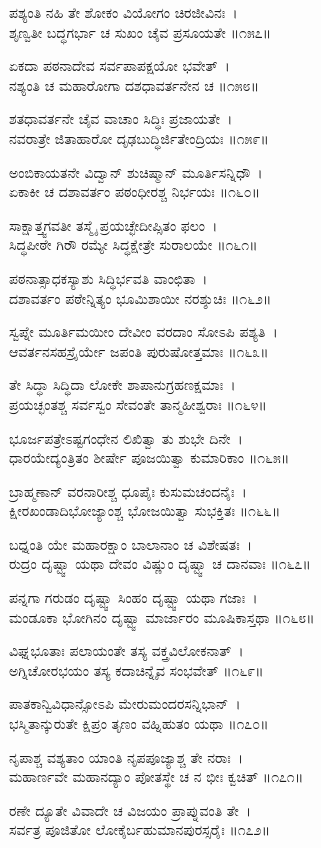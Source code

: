 ಪಶ್ಯಂತಿ ನಹಿ ತೇ ಶೋಕಂ ವಿಯೋಗಂ ಚಿರಜೀವಿನಃ~।\\
ಶೃಣ್ವತೀ ಬದ್ಧಗರ್ಭಾ ಚ ಸುಖಂ ಚೈವ ಪ್ರಸೂಯತೇ ॥೧೫೭॥

ಏಕದಾ ಪಠನಾದೇವ ಸರ್ವಪಾಪಕ್ಷಯೋ ಭವೇತ್~।\\
ನಶ್ಯಂತಿ ಚ ಮಹಾರೋಗಾ ದಶಧಾವರ್ತನೇನ ಚ ॥೧೫೮॥

ಶತಧಾವರ್ತನೇ ಚೈವ ವಾಚಾಂ ಸಿದ್ಧಿಃ ಪ್ರಜಾಯತೇ~।\\
ನವರಾತ್ರೇ ಜಿತಾಹಾರೋ ದೃಢಬುದ್ಧಿರ್ಜಿತೇಂದ್ರಿಯಃ ॥೧೫೯॥

ಅಂಬಿಕಾಯತನೇ ವಿದ್ವಾನ್ ಶುಚಿಷ್ಮಾನ್ ಮೂರ್ತಿಸನ್ನಿಧೌ~।\\
ಏಕಾಕೀ ಚ ದಶಾವರ್ತಂ ಪಠಂಧೀರಶ್ಚ ನಿರ್ಭಯಃ ॥೧೬೦॥

ಸಾಕ್ಷಾತ್ತ್ವಗವತೀ ತಸ್ಮೈ ಪ್ರಯಚ್ಛೇದೀಪ್ಸಿತಂ ಫಲಂ~।\\
ಸಿದ್ಧಪೀಠೇ ಗಿರೌ ರಮ್ಯೇ ಸಿದ್ಧಕ್ಷೇತ್ರೇ ಸುರಾಲಯೇ ॥೧೬೧॥

ಪಠನಾತ್ಸಾಧಕಸ್ಯಾಶು ಸಿದ್ಧಿರ್ಭವತಿ ವಾಂಛಿತಾ~।\\
ದಶಾವರ್ತಂ ಪಠೇನ್ನಿತ್ಯಂ ಭೂಮಿಶಾಯೀ ನರಶ್ಶುಚಿಃ ॥೧೬೨॥

ಸ್ವಪ್ನೇ ಮೂರ್ತಿಮಯೀಂ ದೇವೀಂ ವರದಾಂ ಸೋಽಪಿ ಪಶ್ಯತಿ~।\\
ಆವರ್ತನಸಹಸ್ರೈರ್ಯೇ ಜಪಂತಿ ಪುರುಷೋತ್ತಮಾಃ ॥೧೬೩॥

ತೇ ಸಿದ್ಧಾ ಸಿದ್ಧಿದಾ ಲೋಕೇ ಶಾಪಾನುಗ್ರಹಣಕ್ಷಮಾಃ~।\\
ಪ್ರಯಚ್ಛಂತಶ್ಚ ಸರ್ವಸ್ವಂ ಸೇವಂತೇ ತಾನ್ಮಹೀಶ್ವರಾಃ ॥೧೬೪॥

ಭೂರ್ಜಪತ್ರೇಽಷ್ಟಗಂಧೇನ ಲಿಖಿತ್ವಾ ತು ಶುಭೇ ದಿನೇ~।\\
ಧಾರಯೇದ್ಯಂತ್ರಿತಂ ಶೀರ್ಷೇ ಪೂಜಯಿತ್ವಾ ಕುಮಾರಿಕಾಂ ॥೧೬೫॥

ಬ್ರಾಹ್ಮಣಾನ್ ವರನಾರೀಶ್ಚ ಧೂಪೈಃ ಕುಸುಮಚಂದನೈಃ~।\\
ಕ್ಷೀರಖಂಡಾದಿಭೋಜ್ಯಾಂಶ್ಚ ಭೋಜಯಿತ್ವಾ ಸುಭಕ್ತಿತಃ ॥೧೬೬॥

ಬಧ್ನಂತಿ ಯೇ ಮಹಾರಕ್ಷಾಂ ಬಾಲಾನಾಂ ಚ ವಿಶೇಷತಃ~।\\
ರುದ್ರಂ ದೃಷ್ಟ್ವಾ ಯಥಾ ದೇವಂ ವಿಷ್ಣುಂ ದೃಷ್ಟ್ವಾ ಚ ದಾನವಾಃ ॥೧೬೭॥

ಪನ್ನಗಾ ಗರುಡಂ ದೃಷ್ಟ್ವಾ ಸಿಂಹಂ ದೃಷ್ಟ್ವಾ ಯಥಾ ಗಜಾಃ~।\\
ಮಂಡೂಕಾ ಭೋಗಿನಂ ದೃಷ್ಟ್ವಾ ಮಾರ್ಜಾರಂ ಮೂಷಿಕಾಸ್ತಥಾ ॥೧೬೮॥

ವಿಘ್ನಭೂತಾಃ ಪಲಾಯಂತೇ ತಸ್ಯ ವಕ್ತ್ರವಿಲೋಕನಾತ್~।\\
ಅಗ್ನಿಚೋರಭಯಂ ತಸ್ಯ ಕದಾಚಿನ್ನೈವ ಸಂಭವೇತ್ ॥೧೬೯॥

ಪಾತಕಾನ್ವಿವಿಧಾನ್ಸೋಽಪಿ ಮೇರುಮಂದರಸನ್ನಿಭಾನ್~।\\
ಭಸ್ಮಿತಾನ್ಕುರುತೇ ಕ್ಷಿಪ್ರಂ ತೃಣಂ ವಹ್ನಿಹುತಂ ಯಥಾ ॥೧೭೦॥

ನೃಪಾಶ್ಚ ವಶ್ಯತಾಂ ಯಾಂತಿ ನೃಪಪೂಜ್ಯಾಶ್ಚ ತೇ ನರಾಃ~।\\
ಮಹಾರ್ಣವೇ ಮಹಾನದ್ಯಾಂ ಪೋತಸ್ಥೇ ಚ ನ ಭೀಃ ಕ್ವಚಿತ್ ॥೧೭೧॥

ರಣೇ ದ್ಯೂತೇ ವಿವಾದೇ ಚ ವಿಜಯಂ ಪ್ರಾಪ್ನುವಂತಿ ತೇ~।\\
ಸರ್ವತ್ರ ಪೂಜಿತೋ ಲೋಕೈರ್ಬಹುಮಾನಪುರಸ್ಸರೈಃ ॥೧೭೨॥

